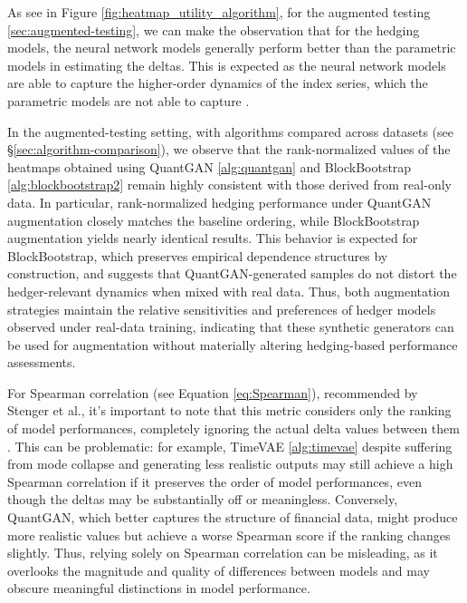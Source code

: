     As see in Figure \ref{fig:heatmap_utility_algorithm},
    for the augmented testing \ref{sec:augmented-testing}, we can make the observation that for the
    hedging models, the neural network models generally perform better
    than the parametric models in estimating the deltas. This is expected
    as the neural network models are able to capture the higher-order
    dynamics of the index series, which the parametric models are not
    able to capture \cite{Fecamp20}.

    In the augmented-testing setting, with algorithms compared across
    datasets (see §\ref{sec:algorithm-comparison}), we observe that
    the rank-normalized values of the
    heatmaps obtained using QuantGAN \ref{alg:quantgan}
    and BlockBootstrap \ref{alg:blockbootstrap2}
     remain highly consistent with those derived from real-only
    data. In particular, rank-normalized hedging performance under
    QuantGAN augmentation closely matches the baseline ordering, while
    BlockBootstrap augmentation yields nearly identical results. This
    behavior is expected for BlockBootstrap, which preserves empirical
    dependence structures by construction, and suggests that
    QuantGAN-generated samples do not distort the hedger-relevant
    dynamics when mixed with real data. Thus, both augmentation
    strategies maintain the relative sensitivities and preferences of
    hedger models observed under real-data training, indicating that
    these synthetic generators can be used for augmentation without
    materially altering hedging-based performance assessments.

    For Spearman correlation (see Equation \ref{eq:Spearman}),
    recommended by Stenger et al., it's important to note that this metric
    considers only the ranking of model performances, completely ignoring
    the actual delta values between them \cite{Stenger24}. This can be 
    problematic: for
    example, TimeVAE \ref{alg:timevae} \textemdash despite suffering 
    from mode collapse and generating
    less realistic outputs \textemdash may still achieve a high Spearman correlation
    if it preserves the order of model performances, even though the
    deltas may be substantially off or meaningless. Conversely, QuantGAN,
    which better captures the structure of financial data, might produce
    more realistic values but achieve a worse Spearman score if the
    ranking changes slightly. Thus, relying solely on Spearman
    correlation can be misleading, as it overlooks the magnitude and
    quality of differences between models and may obscure meaningful
    distinctions in model performance.
  
